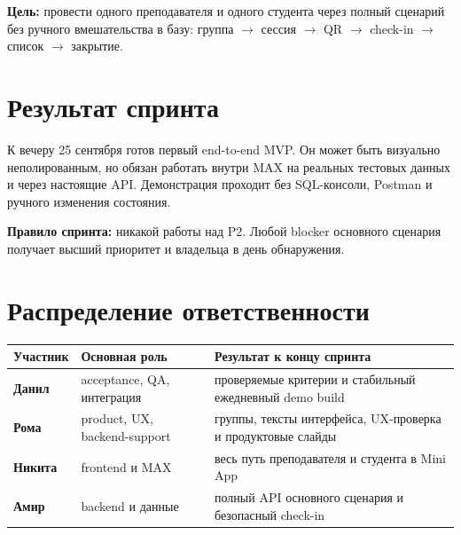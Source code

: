 \documentclass[11pt,a4paper]{article}
\begin{document}
\begin{titlepage}\pagecolor{MaxPurple}\color{white}\par{}\par\vspace{9mm}{\Large 24-25 сентября 2026}\par\vfill
\begin{tcolorbox}[colback=white,colframe=white,arc=3mm,boxrule=0pt]\color{Ink}\textbf{Цель:} провести одного преподавателя и одного студента через полный сценарий без ручного вмешательства в базу: группа $\rightarrow$ сессия $\rightarrow$ QR $\rightarrow$ check-in $\rightarrow$ список $\rightarrow$ закрытие.\end{tcolorbox}\vspace{8mm}{\large Команда: Данил, Рома, Никита, Амир}\par\end{titlepage}\nopagecolor\color{Ink}

\section{Результат спринта}
\begin{goalbox}
К вечеру 25 сентября готов первый end-to-end MVP. Он может быть визуально неполированным, но обязан работать внутри MAX на реальных тестовых данных и через настоящие API. Демонстрация проходит без SQL-консоли, Postman и ручного изменения состояния.
\end{goalbox}
\begin{alertbox}\textbf{Правило спринта:} никакой работы над P2. Любой blocker основного сценария получает высший приоритет и владельца в день обнаружения.\end{alertbox}

\section{Распределение ответственности}
\begin{tabularx}{\textwidth}{>{\bfseries}p{25mm}p{34mm}X}\toprule
Участник & Основная роль & Результат к концу спринта\\\midrule
Данил & acceptance, QA, интеграция & проверяемые критерии и стабильный ежедневный demo build\\
Рома & product, UX, backend-support & группы, тексты интерфейса, UX-проверка и продуктовые слайды\\
Никита & frontend и MAX & весь путь преподавателя и студента в Mini App\\
Амир & backend и данные & полный API основного сценария и безопасный check-in\\\bottomrule
\end{tabularx}
\end{document}
